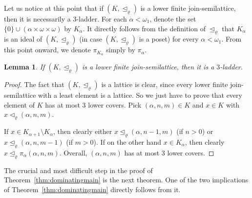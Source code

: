 \documentclass[]{amsart}
\newtheorem{lemma}[theorem]{Lemma}
\theoremstyle{definition}
\theoremstyle{remark}
\begin{document}
Let us notice at this point that if $(K, \trianglelefteq_\varrho)$ is a lower finite join-semilattice, then it is necessarily a $3$-ladder. For each $\alpha < \omega_1$, denote the set $\{0\} \cup (\alpha \times \omega \times \omega)$ by $K_\alpha$. It directly follows from the definition of $\trianglelefteq_\varrho$ that $K_\alpha$ is an ideal of $(K, \trianglelefteq_\varrho)$ (in case $(K, \trianglelefteq_\varrho)$ is a poset) for every $\alpha < \omega_1$. From this point onward, we denote $\pi_{K_\alpha}$ simply by $\pi_\alpha$.
\begin{lemma}\label{lemma:Kladder}
If $(K, \trianglelefteq_\varrho)$ is a lower finite join-semilattice, then it is a $3$-ladder.
\end{lemma}
\begin{proof}
The fact that  $(K, \trianglelefteq_\varrho)$ is a lattice is clear, since every lower finite join-semilattice with a least element is a lattice. So we just have to prove that every element of $K$ has at most $3$ lower covers.  Pick $(\alpha, n, m) \in K$ and $x \in K$ with $x \lhd_\varrho (\alpha, n, m)$. 

If $x \in K_{\alpha+1} \setminus K_\alpha$, then clearly either $x \trianglelefteq_\varrho (\alpha, n-1, m)$ (if $n > 0$) or $x \trianglelefteq_\varrho (\alpha, n, m-1)$ (if $m > 0$). If on the other hand $x \in K_\alpha$, then clearly $x \trianglelefteq_\varrho \pi_\alpha(\alpha, n, m)$. Overall, $(\alpha, n, m)$ has at most $3$ lower covers.
\end{proof}

The crucial and most difficult step in the proof of Theorem~\ref{thm:dominatingmain} is the next theorem.  One of the two implications of Theorem~\ref{thm:dominatingmain} directly follows from it.
\end{document}
